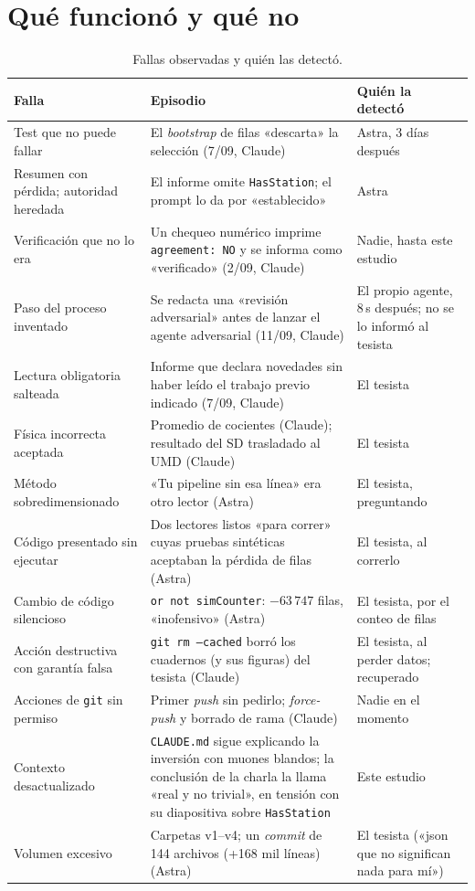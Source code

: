 \documentclass[11pt,a4paper]{article}
\newcommand{\code}[1]{\texttt{#1}}
\begin{document}
\section{Qué funcionó y qué no}
{\small
\begin{longtable}{>{\raggedright}p{3.6cm}>{\raggedright}p{7.2cm}>{\raggedright\arraybackslash}p{3.8cm}}
\caption{Fallas observadas y quién las detectó.}\label{tab:fallas}\\
\toprule
\textbf{Falla} & \textbf{Episodio} & \textbf{Quién la detectó}\\
\midrule\endhead
Test que no puede fallar & El \emph{bootstrap} de filas «descarta» la selección (7/09, Claude) & Astra, 3 días después\\
Resumen con pérdida; autoridad heredada & El informe omite \code{HasStation}; el prompt lo da por «establecido» & Astra\\
Verificación que no lo era & Un chequeo numérico imprime \code{agreement: NO} y se informa como «verificado» (2/09, Claude) & Nadie, hasta este estudio\\
Paso del proceso inventado & Se redacta una «revisión adversarial» antes de lanzar el agente adversarial (11/09, Claude) & El propio agente, 8\,s después; no se lo informó al tesista\\
Lectura obligatoria salteada & Informe que declara novedades sin haber leído el trabajo previo indicado (7/09, Claude) & El tesista\\
Física incorrecta aceptada & Promedio de cocientes (Claude); resultado del SD trasladado al UMD (Claude) & El tesista\\
Método sobredimensionado & «Tu pipeline sin esa línea» era otro lector (Astra) & El tesista, preguntando\\
Código presentado sin ejecutar & Dos lectores listos «para correr» cuyas pruebas sintéticas aceptaban la pérdida de filas (Astra) & El tesista, al correrlo\\
Cambio de código silencioso & \code{or not simCounter}: $-63\,747$ filas, «inofensivo» (Astra) & El tesista, por el conteo de filas\\
Acción destructiva con garantía falsa & \code{git rm --cached} borró los cuadernos (y sus figuras) del tesista (Claude) & El tesista, al perder datos; recuperado\\
Acciones de \code{git} sin permiso & Primer \emph{push} sin pedirlo; \emph{force-push} y borrado de rama (Claude) & Nadie en el momento\\
Contexto desactualizado & \code{CLAUDE.md} sigue explicando la inversión con muones blandos; la conclusión de la charla la llama «real y no trivial», en tensión con su diapositiva sobre \code{HasStation} & Este estudio\\
Volumen excesivo & Carpetas v1--v4; un \emph{commit} de 144 archivos (+168 mil líneas) (Astra) & El tesista («json que no significan nada para mí»)\\
\bottomrule
\end{longtable}
}
\end{document}

